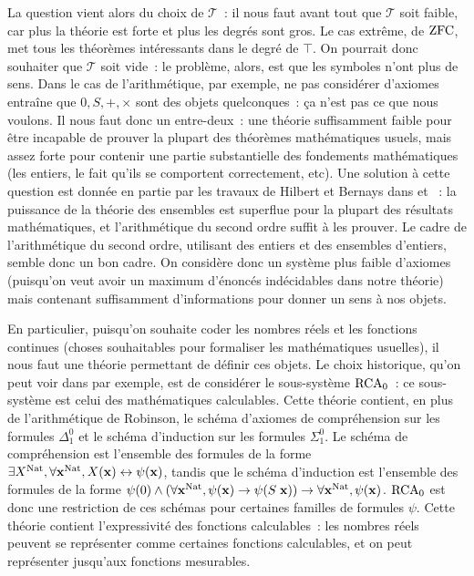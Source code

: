 \documentclass{article}
\begin{document}
La question vient alors du choix de $\mathcal T$~: il nous faut avant tout que $\mathcal T$ soit faible, car plus la théorie est forte et plus les degrés sont gros. Le cas extrême, de $\mathrm{ZFC}$, met tous les théorèmes intéressants dans le degré de $\top$. On pourrait donc souhaiter que $\mathcal T$ soit vide~: le problème, alors, est que les symboles n'ont plus de sens. Dans le cas de l'arithmétique, par exemple, ne pas considérer d'axiomes entraîne que $0,S,+,\times$ sont des objets quelconques~: ça n'est pas ce que nous voulons. Il nous faut donc un entre-deux~: une théorie suffisamment faible pour être incapable de prouver la plupart des théorèmes mathématiques usuels, mais assez forte pour contenir une partie substantielle des fondements mathématiques (les entiers, le fait qu'ils se comportent correctement, etc). Une solution à cette question est donnée en partie par les travaux de Hilbert et Bernays dans \cite{Hilbert1935-HILGDM-8} et \cite{Hilbert1974-HILGDM-5}~: la puissance de la théorie des ensembles est superflue pour la plupart des résultats mathématiques, et l'arithmétique du second ordre suffit à les prouver. Le cadre de l'arithmétique du second ordre, utilisant des entiers et des ensembles d'entiers, semble donc un bon cadre. On considère donc un système plus faible d'axiomes (puisqu'on veut avoir un maximum d'énoncés indécidables dans notre théorie) mais contenant suffisamment d'informations pour donner un sens à nos objets.

En particulier, puisqu'on souhaite coder les nombres réels et les fonctions continues (choses souhaitables pour formaliser les mathématiques usuelles), il nous faut une théorie permettant de définir ces objets. Le choix historique, qu'on peut voir dans \cite{Simpson_2009} par exemple, est de considérer le sous-système $\mathrm{RCA}_0$~: ce sous-système est celui des mathématiques calculables. Cette théorie contient, en plus de l'arithmétique de Robinson, le schéma d'axiomes de compréhension sur les formules $\Delta_1^0$ et le schéma d'induction sur les formules $\Sigma_1^0$. Le schéma de compréhension est l'ensemble des formules de la forme $\exists X^{\mathrm{Nat}}, \forall \mathbf{x}^{\mathrm{Nat}}, X(\mathbf{x}) \leftrightarrow \psi(\mathbf{x})$, tandis que le schéma d'induction est l'ensemble des formules de la forme $\psi(0)\land (\forall \mathbf{x}^{\mathrm{Nat}}, \psi(\mathbf{x}) \to \psi(S\;\mathbf{x})) \to \forall \mathbf{x}^{\mathrm{Nat}}, \psi(\mathbf{x})$. $\mathrm{RCA}_0$ est donc une restriction de ces schémas pour certaines familles de formules $\psi$. Cette théorie contient l'expressivité des fonctions calculables~: les nombres réels peuvent se représenter comme certaines fonctions calculables, et on peut représenter jusqu'aux fonctions mesurables.
\end{document}
